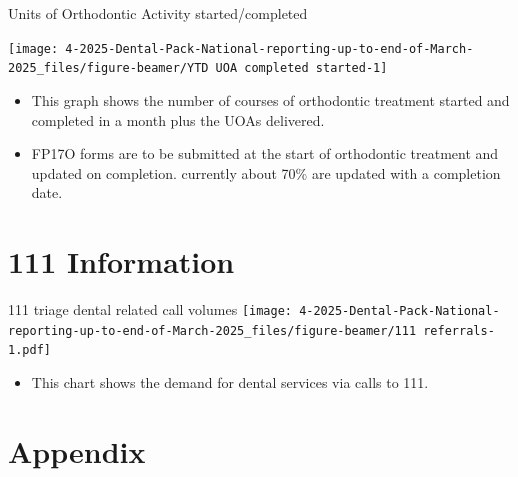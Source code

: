 \documentclass[
  8pt,
  ignorenonframetext,
  aspectratio = 169]{beamer}
\providecommand{\tightlist}{%
  \setlength{\itemsep}{0pt}\setlength{\parskip}{0pt}}
\begin{document}
\begin{frame}{Units of Orthodontic Activity started/completed}
\protect\hypertarget{units-of-orthodontic-activity-startedcompleted}{}
\begin{center}\texttt{[image: 4-2025-Dental-Pack-National-reporting-up-to-end-of-March-2025\_files/figure-beamer/YTD UOA completed started-1]} \end{center}

\begin{itemize}
\tightlist
\item
  This graph shows the number of courses of orthodontic treatment
  started and completed in a month plus the UOAs delivered.
\item
  FP17O forms are to be submitted at the start of orthodontic treatment
  and updated on completion. currently about 70\% are updated with a
  completion date.
\end{itemize}
\end{frame}

\hypertarget{information}{%
\section{111 Information}\label{information}}

\begin{frame}{111 triage dental related call volumes}
\protect\hypertarget{triage-dental-related-call-volumes}{}
\texttt{[image: 4-2025-Dental-Pack-National-reporting-up-to-end-of-March-2025\_files/figure-beamer/111 referrals-1.pdf]}

\begin{itemize}
\tightlist
\item
  This chart shows the demand for dental services via calls to 111.
\end{itemize}
\end{frame}

\hypertarget{appendix}{%
\section{Appendix}\label{appendix}}
\end{document}
